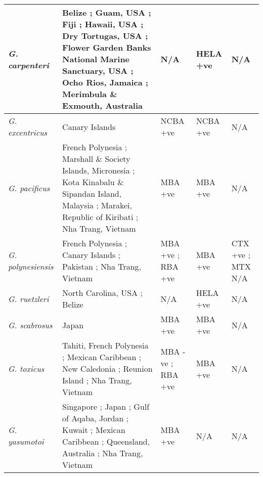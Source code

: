 \documentclass[12pt]{article}
\begin{document}
\begin{longtable}{ | p{2cm} | p{5.5cm} | p{2.3cm} | p{2.3cm} | p{2.3cm} | }
	\emph{G. carpenteri} & Belize \cite{litaker2009taxonomy}; Guam, USA \cite{litaker2009taxonomy}; Fiji \cite{litaker2009taxonomy}; Hawaii, USA \cite{}; Dry Tortugas, USA \cite{holland2013differences}; Flower Garden Banks National Marine Sanctuary, USA \cite{holland2013differences}; Ocho Rios, Jamaica \cite{}; Merimbula \& Exmouth, Australia \cite{kohli2014cob} & N/A & HELA +ve \cite{holland2013differences} & N/A \\
	\hline
	\emph{G. excentricus} & Canary Islands \cite{fraga2011gambierdiscus} & NCBA +ve \cite{fraga2011gambierdiscus} & NCBA +ve \cite{fraga2011gambierdiscus} & N/A \\
	\hline
		\emph{G. pacificus} & French Polynesia \cite{chinain1999morphology}; Marshall \& Society Islands, Micronesia \cite{litaker2010global}; Kota Kinabalu \& Sipandan Island, Malaysia \cite{mohammad2005marine}; Marakei, Republic of Kiribati \cite{xu2014distribution}; Nha Trang, Vietnam \cite{} & MBA +ve \cite{chinain1999morphology} & MBA +ve \cite{chinain1999morphology} & N/A \\
	\hline
	\emph{G. polynesiensis} & French Polynesia \cite{chinain1999morphology}; Canary Islands \cite{fraga2011gambierdiscus}; Pakistan \cite{munir2011occurrence}; Nha Trang, Vietnam \cite{} & MBA +ve \cite{chinain1999morphology}; RBA +ve \cite{chinain2010growth} & MBA +ve \cite{chinain1999morphology} & CTX +ve \cite{chinain2010growth}; MTX N/A \\
	\hline
	\emph{G. ruetzleri} & North Carolina, USA \cite{litaker2009taxonomy}; Belize \cite{litaker2009taxonomy} & N/A & HELA +ve \cite{holland2013differences} & N/A \\
	\hline
	\emph{G. scabrosus} & Japan \cite{nishimura2013genetic} & MBA +ve \cite{nishimura2013genetic} & MBA +ve \cite{nishimura2013genetic} & N/A \\
	\hline
	\emph{G. toxicus} & Tahiti, French Polynesia \cite{adachi1979thecal,chinain1999morphology}; Mexican Caribbean \cite{hernandez2004species}; New Caledonia \cite{chinain1999morphology}; Reunion Island \cite{chinain1999morphology}; Nha Trang, Vietnam \cite{roeder2010characteristic} & MBA -ve \cite{chinain1999morphology}; RBA +ve \cite{chinain2010growth} & MBA +ve \cite{chinain1999morphology} & N/A \\
	\hline
	\emph{G. yasumotoi} & Singapore \cite{holmes1998gambierdiscus}; Japan \cite{nishimura2013genetic}; Gulf of Aqaba, Jordan \cite{saburova2013new}; Kuwait \cite{saburova2013new}; Mexican Caribbean \cite{hernandez2004species}; Queensland, Australia \cite{}; Nha Trang, Vietnam \cite{} & MBA +ve \cite{} & N/A & N/A \\ %

\end{longtable}
\end{document}
